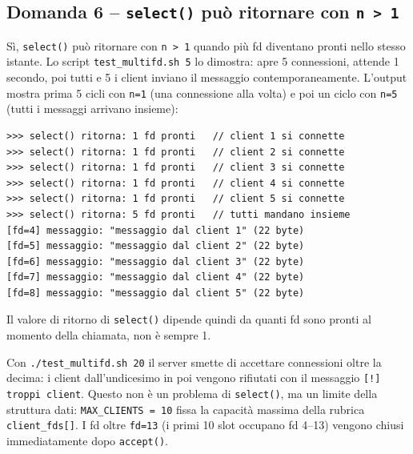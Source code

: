 \documentclass[a4paper,12pt]{article}
\begin{document}
\subsection*{Domanda 6 -- \texttt{select()} può ritornare con \texttt{n > 1}}

Sì, \texttt{select()} può ritornare con \texttt{n > 1} quando più fd diventano pronti
nello stesso istante. Lo script \texttt{test\_multifd.sh 5} lo dimostra: apre 5 connessioni,
attende 1 secondo, poi tutti e 5 i client inviano il messaggio contemporaneamente.
L'output mostra prima 5 cicli con \texttt{n=1} (una connessione alla volta) e poi un ciclo
con \texttt{n=5} (tutti i messaggi arrivano insieme):

\begin{lstlisting}
>>> select() ritorna: 1 fd pronti   // client 1 si connette
>>> select() ritorna: 1 fd pronti   // client 2 si connette
>>> select() ritorna: 1 fd pronti   // client 3 si connette
>>> select() ritorna: 1 fd pronti   // client 4 si connette
>>> select() ritorna: 1 fd pronti   // client 5 si connette
>>> select() ritorna: 5 fd pronti   // tutti mandano insieme
[fd=4] messaggio: "messaggio dal client 1" (22 byte)
[fd=5] messaggio: "messaggio dal client 2" (22 byte)
[fd=6] messaggio: "messaggio dal client 3" (22 byte)
[fd=7] messaggio: "messaggio dal client 4" (22 byte)
[fd=8] messaggio: "messaggio dal client 5" (22 byte)
\end{lstlisting}

Il valore di ritorno di \texttt{select()} dipende quindi da quanti fd sono pronti
al momento della chiamata, non è sempre 1.

Con \texttt{./test\_multifd.sh 20} il server smette di accettare connessioni oltre la
decima: i client dall'undicesimo in poi vengono rifiutati con il messaggio
\texttt{[!] troppi client}.
Questo non è un problema di \texttt{select()}, ma un limite della struttura dati:
\texttt{MAX\_CLIENTS = 10} fissa la capacità massima della rubrica \texttt{client\_fds[]}.
I fd oltre \texttt{fd=13} (i primi 10 slot occupano fd 4--13) vengono chiusi immediatamente
dopo \texttt{accept()}.
\end{document}
